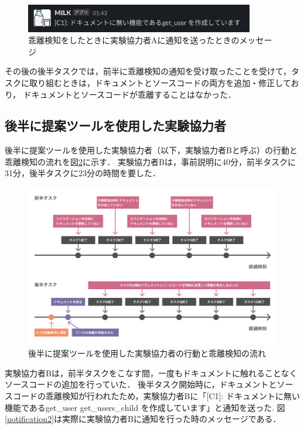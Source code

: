 \begin{figure}[H]
    \centering
    \includegraphics[width=10cm]{images/notification1.png}
    \caption{乖離検知をしたときに実験協力者Aに通知を送ったときのメッセージ}
    \label{notification1}
\end{figure}

その後の後半タスクでは，前半に乖離検知の通知を受け取ったことを受けて，タスクに取り組むときは，ドキュメントとソースコードの両方を追加・修正しており，
ドキュメントとソースコードが乖離することはなかった．

\subsection{後半に提案ツールを使用した実験協力者}
後半に提案ツールを使用した実験協力者（以下，実験協力者Bと呼ぶ）の行動と乖離検知の流れを図\ref{userb}に示す．
実験協力者Bは，事前説明に40分，前半タスクに31分，後半タスクに23分の時間を要した．
\begin{figure}[H]
    \centering
    \includegraphics[width=14cm]{images/userb.png}
    \caption{後半に提案ツールを使用した実験協力者の行動と乖離検知の流れ}
    \label{userb}
\end{figure}

実験協力者Bは，前半タスクをこなす間，一度もドキュメントに触れることなくソースコードの追加を行っていた．
後半タスク開始時に，ドキュメントとソースコードの乖離検知が行われたため，実験協力者Bに「[C1]: ドキュメントに無い機能であるget\_user get\_users\_child を作成しています」と通知を送った.
図\ref{notification2}は実際に実験協力者Bに通知を行った時のメッセージである．

